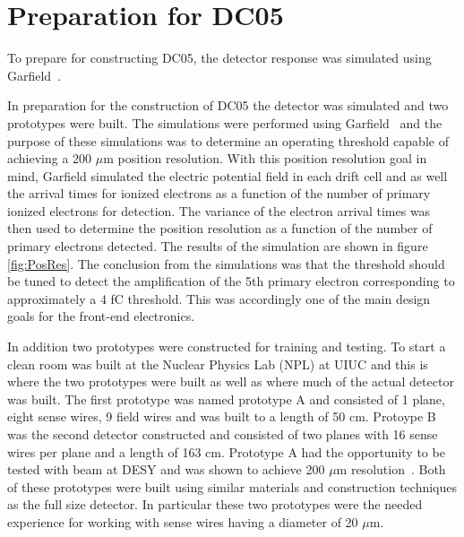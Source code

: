 \section{Preparation for DC05}
To prepare for constructing DC05, the detector response was simulated using
Garfield~\cite{garfield}.

In preparation for the construction of DC05 the detector was simulated and two
prototypes were built.  The simulations were performed using
Garfield~\cite{garfield} and the purpose of these simulations was to determine
an operating threshold capable of achieving a 200 $\mu$m position resolution.
With this position resolution goal in mind, Garfield simulated the electric
potential field in each drift cell and as well the arrival times for ionized
electrons as a function of the number of primary ionized electrons for
detection.  The variance of the electron arrival times was then used to
determine the position resolution as a function of the number of primary
electrons detected.  The results of the simulation are shown in figure
\ref{fig:PosRes}.  The conclusion from the simulations was that the threshold
should be tuned to detect the amplification of the 5th primary electron
corresponding to approximately a 4 fC threshold.  This was accordingly one of
the main design goals for the front-end electronics. \par


In addition two prototypes were constructed for training and testing.  To start
a clean room was built at the Nuclear Physics Lab (NPL) at UIUC and this is
where the two prototypes were built as well as where much of the actual detector
was built.  The first prototype was named prototype A and consisted of 1 plane,
eight sense wires, 9 field wires and was built to a length of 50 cm.  Protoype B
was the second detector constructed and consisted of two planes with 16 sense
wires per plane and a length of 163 cm.  Prototype A had the opportunity to be
tested with beam at DESY and was shown to achieve 200 $\mu$m
resolution~\cite{choi}.  Both of these prototypes were built using similar
materials and construction techniques as the full size detector.  In particular
these two prototypes were the needed experience for working with sense wires
having a diameter of 20 $\mu$m.
